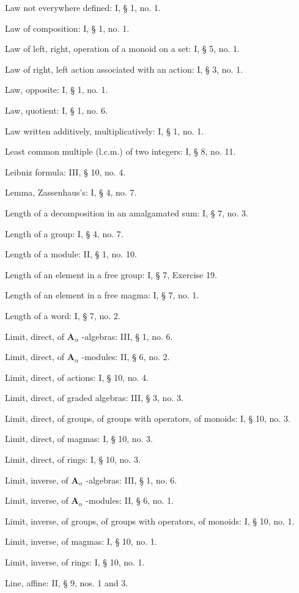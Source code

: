 Law not everywhere defined: I, § 1, no. 1.

Law of composition: I, § 1, no. 1.

Law of left, right, operation of a monoid on a set: I, § 5, no. 1.

Law of right, left action associated with an action: I, § 3, no. 1.

Law, opposite: I, § 1, no. 1.

Law, quotient: I, § 1, no. 6.

Law written additively, multiplicatively: I, § 1, no. 1.

Least common multiple (l.c.m.) of two integers: I, § 8, no. 11.

Leibniz formula: III, § 10, no. 4.

Lemma, Zassenhaus's: I, § 4, no. 7.

Length of a decomposition in an amalgamated sum: I, § 7, no. 3.

Length of a group: I, § 4, no. 7.

Length of a module: II, § 1, no. 10.

Length of an element in a free group: I, § 7, Exercise 19.

Length of an element in a free magma: I, § 7, no. 1.

Length of a word: I, § 7, no. 2.

Limit, direct, of \(\mathbf{A}_{\alpha}\) -algebras: III, § 1, no. 6.

Limit, direct, of \(\mathbf{A}_{\alpha}\) -modules: II, § 6, no. 2.

Limit, direct, of actions: I, § 10, no. 4.

Limit, direct, of graded algebras: III, § 3, no. 3.

Limit, direct, of groups, of groups with operators, of monoids: I, § 10, no. 3.

Limit, direct, of magmas: I, § 10, no. 3.

Limit, direct, of rings: I, § 10, no. 3.

Limit, inverse, of \(\mathbf{A}_{\alpha}\) -algebras: III, § 1, no. 6.

Limit, inverse, of \(\mathbf{A}_{\alpha}\) -modules: II, § 6, no. 1.

Limit, inverse, of groups, of groups with operators, of monoids: I, § 10, no. 1.

Limit, inverse, of magmas: I, § 10, no. 1.

Limit, inverse, of rings: I, § 10, no. 1.

Line, affine: II, § 9, nos. 1 and 3.

